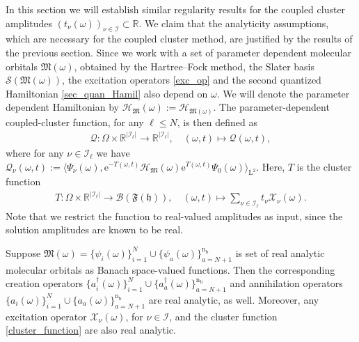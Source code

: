 \documentclass[reqno]{amsart}
\begin{document}
In this section we will establish similar regularity results for the coupled cluster amplitudes $(t_\nu(\omega))_{\nu \in \mathscr{I}}\subset \mathbb{R}$. We claim that the analyticity assumptions, which are necessary for the coupled cluster method, are justified by the results of the previous section. Since we work with a set of parameter dependent molecular orbitals $\mathfrak{M}(\omega)$, obtained by the Hartree–Fock method, the Slater basis $\mathcal{S}(\mathfrak{M}(\omega))$, the excitation operators \eqref{exc_op} and the second quantized Hamiltonian \eqref{sec_quan_Hamil} also depend on $\omega$. We will denote the parameter dependent Hamiltonian by $\mathcal{H}_{\mathfrak{M}}(\omega):=\mathcal{H}_{\mathfrak{M}(\omega)}$.  The parameter-dependent coupled-cluster function, for any $\ell\le N$, is then defined as
\begin{align}\label{param_cc_func}
    \mathcal{Q}:\Omega\times \mathbb{R}^{|\mathscr{I}_\ell|}\longrightarrow \mathbb{R}^{|\mathscr{I}_\ell|}, \quad (\omega, t)\mapsto \mathcal{Q}(\omega,t),
\end{align}
where for any $\nu\in \mathscr{I}_\ell$ we have $\mathcal{Q}_\nu(\omega,t):=\langle \Psi_\nu(\omega),\mathrm{e}^{-T(\omega,t)}\mathcal{H}_\mathfrak{M}(\omega)\mathrm{e}^{T(\omega,t)}\Psi_0(\omega) \rangle_{\mathrm{L}^2}$. Here, $T$ is the cluster function
\begin{align}\label{cluster_function}
    T:\Omega\times\mathbb{R}^{|\mathscr{I}_\ell|}\longrightarrow \mathcal{B}(\mathfrak{F}(\mathfrak{h})), \quad (\omega, t)\mapsto \sum_{\nu\in \mathscr{I}_\ell}t_\nu \mathscr{X}_\nu(\omega).
\end{align}
Note that we restrict the function to real-valued amplitudes as input, since the solution amplitudes are known to be real.
\begin{lemma}\label{creation_annihili_analytic}
    Suppose $\mathfrak{M}(\omega)=\lbrace \psi_i(\omega)\rbrace_{i=1}^N\cup \lbrace \psi_a(\omega)\rbrace_{a=N+1}^{\mathrm{n}_\mathrm{b}}$ is set of real analytic molecular orbitals as Banach space-valued functions. Then the corresponding creation operators $\lbrace a^\dagger_i(\omega)\rbrace_{i=1}^N\cup \lbrace a^\dagger_a(\omega)\rbrace_{a=N+1}^{\mathrm{n}_\mathrm{b}} $ and annihilation operators $\lbrace a_i(\omega)\rbrace_{i=1}^N\cup \lbrace a_a(\omega)\rbrace_{a=N+1}^{\mathrm{n}_\mathrm{b}}$ are real analytic, as well. Moreover, any excitation operator $\mathscr{X}_\nu(\omega)$, for $\nu\in \mathscr{I}$, and the cluster function \eqref{cluster_function} are also real analytic. 
\end{lemma}
\end{document}

